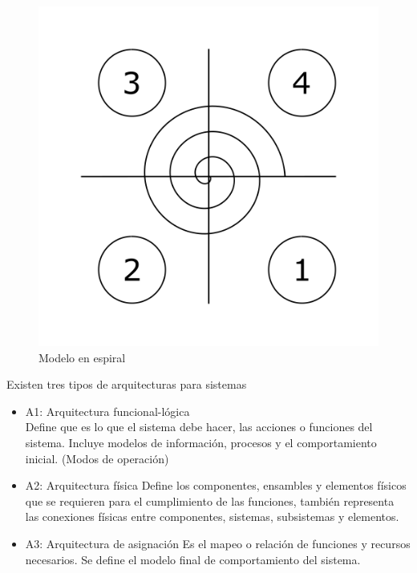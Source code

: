 \begin{enumerate}
    \begin{figure}[h!]
    \centering
        \includegraphics[scale=0.30]{Proyecto Integrador Figuras/07 Modelo Espiral.png}
        \caption{Modelo en espiral}
    \end{figure}

    Existen tres tipos de arquitecturas para sistemas
    
    \begin{itemize}
        \item A1: Arquitectura funcional-lógica\\
            Define que es lo que el sistema debe hacer, las acciones o funciones del sistema. Incluye modelos de información, procesos y el comportamiento inicial. (Modos de operación)
        \item A2: Arquitectura física
            Define los componentes, ensambles y elementos físicos que se requieren para el cumplimiento de las funciones, también representa las conexiones físicas entre componentes, sistemas, subsistemas y elementos.
        \item A3: Arquitectura de asignación
            Es el mapeo o relación de funciones y recursos necesarios. Se define el modelo final de comportamiento del sistema.
    \end{itemize}
\end{enumerate}

